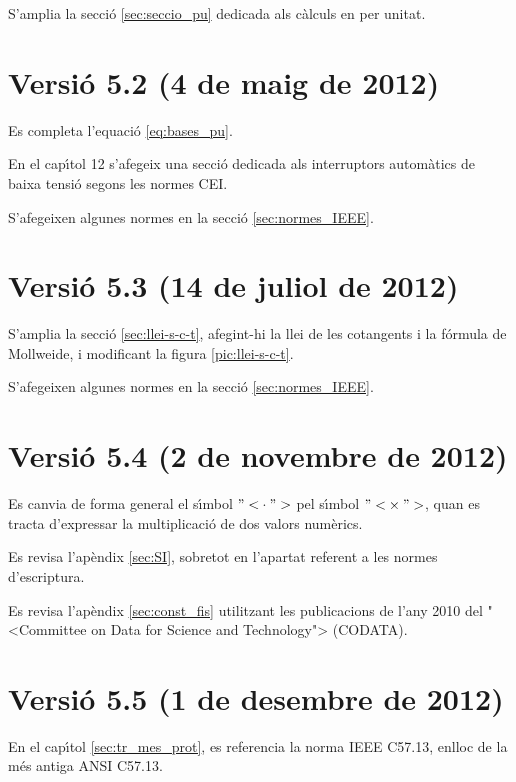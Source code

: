 S'amplia la secci\'{o} \ref{sec:seccio_pu} dedicada als c\`{a}lculs en per unitat.


\section*{Versi\'{o} 5.2 (4 de maig de 2012)}

Es completa l'equaci\'{o} \eqref{eq:bases_pu}.

En el cap\'{\i}tol 12 s'afegeix una secci\'{o} dedicada als interruptors autom\`{a}tics de baixa tensi\'{o} segons les normes \textsf{CEI}.

S'afegeixen algunes normes en la secci\'{o} \ref{sec:normes_IEEE}.

\section*{Versi\'{o} 5.3 (14 de juliol de 2012)}

S'amplia la secci\'{o} \ref{sec:llei-s-c-t}, afegint-hi la llei de les cotangents i la f\'{o}rmula de Mollweide, i modificant  la figura \ref{pic:llei-s-c-t}.

S'afegeixen algunes normes en la secci\'{o} \ref{sec:normes_IEEE}.

\section*{Versi\'{o} 5.4 (2 de novembre de 2012)}

Es canvia de forma general el s\'{\i}mbol ${"<}\cdot{">}$ pel s\'{\i}mbol ${"<}\times{">}$, quan es tracta d'expressar la multiplicaci\'{o} de dos valors num\`{e}rics.

Es revisa l'ap\`{e}ndix \ref{sec:SI}, sobretot en l'apartat referent a les normes d'escriptura.

Es revisa l'ap\`{e}ndix \ref{sec:const_fis} utilitzant les publicacions de l'any 2010 del {"<}Committee on Data for Science and Technology{">} (\textsf{CODATA}).

\section*{Versi\'{o} 5.5 (1 de desembre de 2012)}

En el cap\'{\i}tol \ref{sec:tr_mes_prot}, es referencia la norma  \textsf{IEEE C57.13}, enlloc de la m\'{e}s antiga \textsf{ANSI C57.13}.

